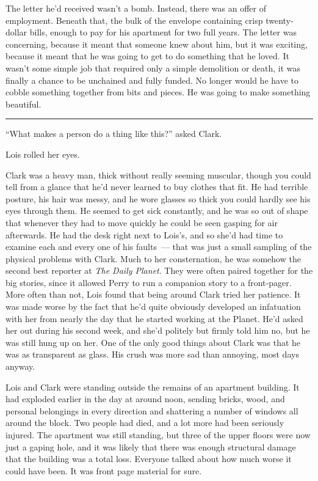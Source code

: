The letter he'd received wasn't a bomb. Instead, there was an offer of
employment. Beneath that, the bulk of the envelope containing crisp
twenty‐dollar bills, enough to pay for his apartment for two full years.
The letter was concerning, because it meant that someone knew about him,
but it was exciting, because it meant that he was going to get to do
something that he loved. It wasn't some simple job that required only a
simple demolition or death, it was finally a chance to be unchained and
fully funded. No longer would he have to cobble something together from
bits and pieces. He was going to make something beautiful.

\begin{center}\rule{0.5\linewidth}{0.5pt}\end{center}

``What makes a person do a thing like this?'' asked Clark.

Lois rolled her eyes.

Clark was a heavy man, thick without really seeming muscular, though you
could tell from a glance that he'd never learned to buy clothes that
fit. He had terrible posture, his hair was messy, and he wore glasses so
thick you could hardly see his eyes through them. He seemed to get sick
constantly, and he was so out of shape that whenever they had to move
quickly he could be seen gasping for air afterwards. He had the desk
right next to Lois's, and so she'd had time to examine each and every
one of his faults~--- that was just a small sampling of the physical
problems with Clark. Much to her consternation, he was somehow the
second best reporter at \emph{The Daily Planet}. They were often paired
together for the big stories, since it allowed Perry to run a companion
story to a front‐pager. More often than not, Lois found that being
around Clark tried her patience. It was made worse by the fact that he'd
quite obviously developed an infatuation with her from nearly the day
that he started working at the Planet. He'd asked her out during his
second week, and she'd politely but firmly told him no, but he was still
hung up on her. One of the only good things about Clark was that he was
as transparent as glass. His crush was more sad than annoying, most days
anyway.

Lois and Clark were standing outside the remains of an apartment
building. It had exploded earlier in the day at around noon, sending
bricks, wood, and personal belongings in every direction and shattering
a number of windows all around the block. Two people had died, and a lot
more had been seriously injured. The apartment was still standing, but
three of the upper floors were now just a gaping hole, and it was likely
that there was enough structural damage that the building was a total
loss. Everyone talked about how much worse it could have been. It was
front page material for sure.

